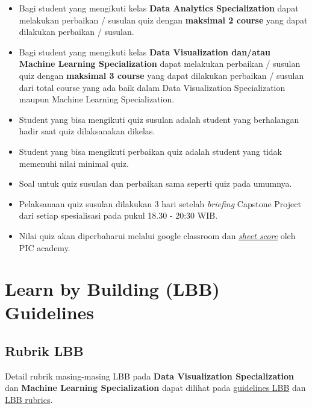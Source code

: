\documentclass[
]{book}
\providecommand{\tightlist}{%
  \setlength{\itemsep}{0pt}\setlength{\parskip}{0pt}}
\begin{document}
\begin{itemize}
\tightlist
\item
  Bagi student yang mengikuti kelas \textbf{Data Analytics Specialization} dapat melakukan perbaikan / susulan quiz dengan \textbf{maksimal 2 course} yang dapat dilakukan perbaikan / susulan.
\item
  Bagi student yang mengikuti kelas \textbf{Data Visualization dan/atau Machine Learning Specialization} dapat melakukan perbaikan / susulan quiz dengan \textbf{maksimal 3 course} yang dapat dilakukan perbaikan / susulan dari total course yang ada baik dalam Data Visualization Specialization maupun Machine Learning Specialization.
\item
  Student yang bisa mengikuti quiz susulan adalah student yang berhalangan hadir saat quiz dilaksanakan dikelas.
\item
  Student yang bisa mengikuti perbaikan quiz adalah student yang tidak memenuhi nilai minimal quiz.
\item
  Soal untuk quiz susulan dan perbaikan sama seperti quiz pada umumnya.
\item
  Pelaksanaan quiz susulan dilakukan 3 hari setelah \emph{briefing} Capstone Project dari setiap spesialisasi pada pukul 18.30 - 20:30 WIB.
\item
  Nilai quiz akan diperbaharui melalui google classroom dan \href{https://docs.google.com/spreadsheets/d/1cGJ0pn9k9gKCBnceWVwaL9D7BBDMNjLh8uPYlaBlJi8/edit?usp=sharing}{\emph{sheet score}} oleh PIC academy.
\end{itemize}

\hypertarget{learn-by-building-lbb-guidelines}{%
\section{Learn by Building (LBB) Guidelines}\label{learn-by-building-lbb-guidelines}}

\hypertarget{rubrik-lbb}{%
\subsection{Rubrik LBB}\label{rubrik-lbb}}

Detail rubrik masing-masing LBB pada \textbf{Data Visualization Specialization} dan \textbf{Machine Learning Specialization} dapat dilihat pada \href{https://rpubs.com/AlgoritmaAcademy/lbb}{guidelines LBB} dan \href{https://docs.google.com/document/d/117LRRFF0jLR5SQku3PYkUggst06Vj9XfNahcK5oJYHs/edit?usp=sharing}{LBB rubrics}.
\end{document}
